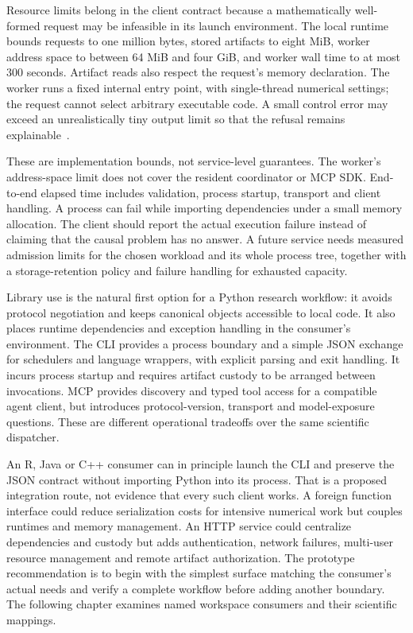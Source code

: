 Resource limits belong in the client contract because a mathematically
well-formed request may be infeasible in its launch environment. The local
runtime bounds requests to one million bytes, stored artifacts to eight
MiB, worker address space to between 64 MiB and four GiB, and worker wall
time to at most 300 seconds. Artifact reads also respect the request's
memory declaration. The worker runs a fixed internal entry point, with
single-thread numerical settings; the request cannot select arbitrary
executable code. A small control error may exceed an unrealistically tiny
output limit so that the refusal remains explainable~\citep{exec13_i2_examples}.

These are implementation bounds, not service-level guarantees. The worker's
address-space limit does not cover the resident coordinator or MCP SDK.
End-to-end elapsed time includes validation, process startup, transport and
client handling. A process can fail while importing dependencies under a
small memory allocation. The client should report the actual execution
failure instead of claiming that the causal problem has no answer. A future
service needs measured admission limits for the chosen workload and its
whole process tree, together with a storage-retention policy and failure
handling for exhausted capacity.

Library use is the natural first option for a Python research workflow: it
avoids protocol negotiation and keeps canonical objects accessible to local
code. It also places runtime dependencies and exception handling in the
consumer's environment. The CLI provides a process boundary and a simple
JSON exchange for schedulers and language wrappers, with explicit parsing
and exit handling. It incurs process startup and requires artifact custody
to be arranged between invocations. MCP provides discovery and typed tool
access for a compatible agent client, but introduces protocol-version,
transport and model-exposure questions. These are different operational
tradeoffs over the same scientific dispatcher.

An R, Java or C++ consumer can in principle launch the CLI and preserve the
JSON contract without importing Python into its process. That is a proposed
integration route, not evidence that every such client works. A foreign
function interface could reduce serialization costs for intensive numerical
work but couples runtimes and memory management. An HTTP service could
centralize dependencies and custody but adds authentication, network
failures, multi-user resource management and remote artifact authorization.
The prototype recommendation is to begin with the simplest surface matching
the consumer's actual needs and verify a complete workflow before adding
another boundary. The following chapter examines named workspace consumers
and their scientific mappings.

